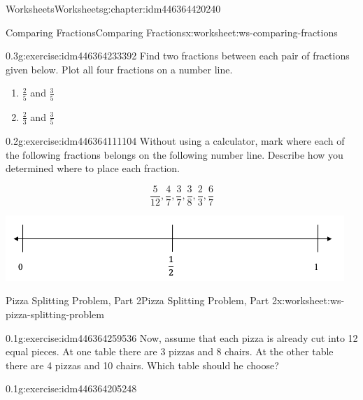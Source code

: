 \documentclass[twoside,11pt,]{book}
\begin{document}
\begin{chapterptx}{Worksheets}{}{Worksheets}{}{}{g:chapter:idm446364420240}
\begin{worksheet-section-numberless}{Comparing Fractions}{}{Comparing Fractions}{}{}{x:worksheet:ws-comparing-fractions}
\begin{divisionexercise}{4}{}{0.3}{g:exercise:idm446364233392}
Find two fractions between each pair of fractions given below. Plot all four fractions on a number line.%
%
\begin{enumerate}[label=(\alph*)]
\item{}\(\frac{2}{5} \) and \(\frac{3}{5} \)%
\item{}\(\frac{2}{3} \) and \(\frac{3}{5} \)%
\end{enumerate}
\end{divisionexercise}%
\begin{divisionexercise}{5}{}{0.2}{g:exercise:idm446364111104}%
Without using a calculator, mark where each of the following fractions belongs on the following number line. Describe how you determined where to place each fraction.%
\par
%
\begin{equation*}
\frac{5}{12} , \frac{4}{7} , \frac{3}{7} , \frac{3}{8} , \frac{2}{3} , \frac{6}{7} 
\end{equation*}
%
\begin{sidebyside}{1}{0.05}{0.05}{0}%
\begin{sbspanel}{0.9}%
\includegraphics[width=1\linewidth]{images/number-line-half-one.png}
\end{sbspanel}%
\end{sidebyside}%
\end{divisionexercise}%
\end{worksheet-section-numberless}
\restoregeometry
%
%
\typeout{************************************************}
\typeout{************************************************}
%
\begin{worksheet-section-numberless}{Pizza Splitting Problem, Part 2}{}{Pizza Splitting Problem, Part 2}{}{}{x:worksheet:ws-pizza-splitting-problem}
\begin{divisionexercise}{1}{}{0.1}{g:exercise:idm446364259536}%
Now, assume that each pizza is already cut into 12 equal pieces. At one table there are 3 pizzas and 8 chairs.  At the other table there are 4 pizzas and 10 chairs.  Which table should he choose?%
\end{divisionexercise}%
\begin{divisionexercise}{2}{}{0.1}{g:exercise:idm446364205248}%

\end{divisionexercise}
\end{worksheet-section-numberless}
\end{chapterptx}
\end{document}
